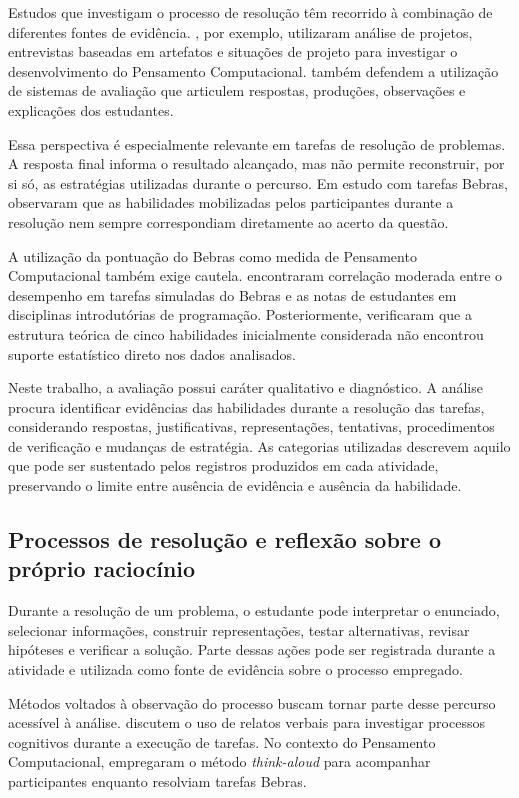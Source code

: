 Estudos que investigam o processo de resolução têm recorrido à combinação de diferentes fontes de evidência. , por exemplo, utilizaram análise de projetos, entrevistas baseadas em artefatos e situações de projeto para investigar o desenvolvimento do Pensamento Computacional.  também defendem a utilização de sistemas de avaliação que articulem respostas, produções, observações e explicações dos estudantes.

Essa perspectiva é especialmente relevante em tarefas de resolução de problemas. A resposta final informa o resultado alcançado, mas não permite reconstruir, por si só, as estratégias utilizadas durante o percurso. Em estudo com tarefas Bebras,  observaram que as habilidades mobilizadas pelos participantes durante a resolução nem sempre correspondiam diretamente ao acerto da questão.

A utilização da pontuação do Bebras como medida de Pensamento Computacional também exige cautela.  encontraram correlação moderada entre o desempenho em tarefas simuladas do Bebras e as notas de estudantes em disciplinas introdutórias de programação. Posteriormente,  verificaram que a estrutura teórica de cinco habilidades inicialmente considerada não encontrou suporte estatístico direto nos dados analisados.

Neste trabalho, a avaliação possui caráter qualitativo e diagnóstico. A análise procura identificar evidências das habilidades durante a resolução das tarefas, considerando respostas, justificativas, representações, tentativas, procedimentos de verificação e mudanças de estratégia. As categorias utilizadas descrevem aquilo que pode ser sustentado pelos registros produzidos em cada atividade, preservando o limite entre ausência de evidência e ausência da habilidade.

\subsection{Processos de resolução e reflexão sobre o próprio raciocínio}

Durante a resolução de um problema, o estudante pode interpretar o enunciado, selecionar informações, construir representações, testar alternativas, revisar hipóteses e verificar a solução. Parte dessas ações pode ser registrada durante a atividade e utilizada como fonte de evidência sobre o processo empregado.

Métodos voltados à observação do processo buscam tornar parte desse percurso acessível à análise.  discutem o uso de relatos verbais para investigar processos cognitivos durante a execução de tarefas. No contexto do Pensamento Computacional,  empregaram o método \textit{think-aloud} para acompanhar participantes enquanto resolviam tarefas Bebras.

